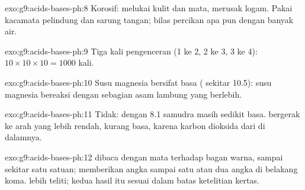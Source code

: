 \begin{solution}{exo:g9:acids-bases-ph:8}
Korosif: melukai kulit dan mata, merusak logam. Pakai kacamata pelindung
dan sarung tangan; bilas percikan apa pun dengan banyak air.
\end{solution}

\begin{solution}{exo:g9:acids-bases-ph:9}
Tiga kali pengenceran (1 ke 2, 2 ke 3, 3 ke 4): $10 \times 10 \times 10 =
1000$ kali.
\end{solution}

\begin{solution}{exo:g9:acids-bases-ph:10}
Susu magnesia bersifat basa ( sekitar 10.5): susu magnesia bereaksi
dengan sebagian asam lambung yang berlebih.
\end{solution}

\begin{solution}{exo:g9:acids-bases-ph:11}
Tidak: dengan  8.1 samudra masih sedikit basa.  bergerak ke arah
yang lebih rendah, kurang basa, karena karbon dioksida dari  
di dalamnya.
\end{solution}

\begin{solution}{exo:g9:acids-bases-ph:12}
 dibaca dengan mata terhadap bagan warna, sampai sekitar satu
satuan;  memberikan angka sampai satu atau dua angka di belakang
koma.  lebih teliti; kedua hasil itu sesuai dalam batas
ketelitian kertas.
\end{solution}

